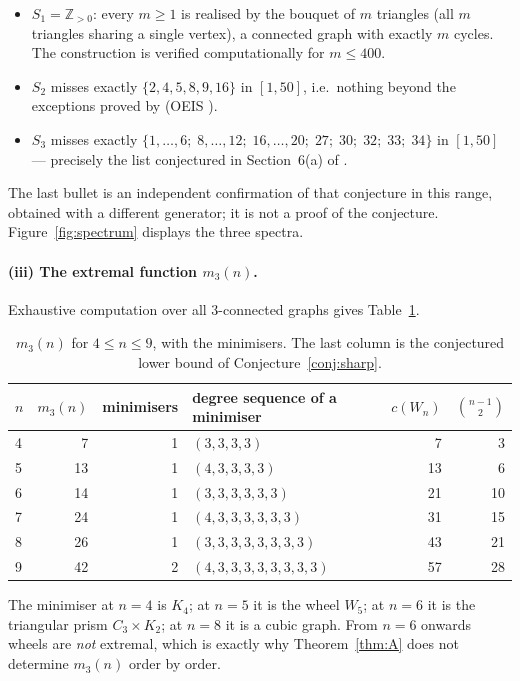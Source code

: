 \documentclass[11pt,a4paper]{article}
\theoremstyle{definition}
\newcommand{\Wi}{W_n}
\begin{document}
\begin{itemize}[leftmargin=*,nosep]
\item $S_1 = \mathbb{Z}_{>0}$: every $m\ge 1$ is realised by the bouquet of
  $m$ triangles (all $m$ triangles sharing a single vertex), a connected graph
  with exactly $m$ cycles.  The construction is verified computationally for
  $m\le 400$.
\item $S_2$ misses exactly $\{2,4,5,8,9,16\}$ in $[1,50]$, i.e.\ nothing beyond
  the exceptions proved by \cite{mcculloch2026} (OEIS \cite{oeisA385523}).
\item $S_3$ misses exactly
  $\{1,\dots,6;\;8,\dots,12;\;16,\dots,20;\;27;\;30;\;32;\;33;\;34\}$ in
  $[1,50]$ --- precisely the list conjectured in Section~6(a) of
  \cite{mcculloch2026}.
\end{itemize}

The last bullet is an independent confirmation of that conjecture in this
range, obtained with a different generator; it is not a proof of the conjecture.
Figure~\ref{fig:spectrum} displays the three spectra.

\paragraph{(iii) The extremal function $m_3(n)$.}  Exhaustive computation over
all $3$-connected graphs gives Table~\ref{tab:m3}.

\begin{table}[h]
\centering
\small
\caption{$m_3(n)$ for $4\le n\le 9$, with the minimisers.  The last column is
the conjectured lower bound of Conjecture~\ref{conj:sharp}.}
\label{tab:m3}
\begin{tabular}{@{}lrrlrr@{}}
\toprule
$n$ & $m_3(n)$ & minimisers & degree sequence of a minimiser & $c(\Wi)$ & $\binom{n-1}{2}$\\
\midrule
4 & 7  & 1 & $(3,3,3,3)$           & 7  & 3\\
5 & 13 & 1 & $(4,3,3,3,3)$         & 13 & 6\\
6 & 14 & 1 & $(3,3,3,3,3,3)$       & 21 & 10\\
7 & 24 & 1 & $(4,3,3,3,3,3,3)$     & 31 & 15\\
8 & 26 & 1 & $(3,3,3,3,3,3,3,3)$   & 43 & 21\\
9 & 42 & 2 & $(4,3,3,3,3,3,3,3,3)$& 57 & 28\\
\bottomrule
\end{tabular}
\end{table}

The minimiser at $n=4$ is $K_4$; at $n=5$ it is the wheel $W_5$; at $n=6$ it is
the triangular prism $C_3\times K_2$; at $n=8$ it is a cubic graph.  From $n=6$
onwards wheels are \emph{not} extremal, which is exactly why Theorem~\ref{thm:A}
does not determine $m_3(n)$ order by order.
\end{document}
